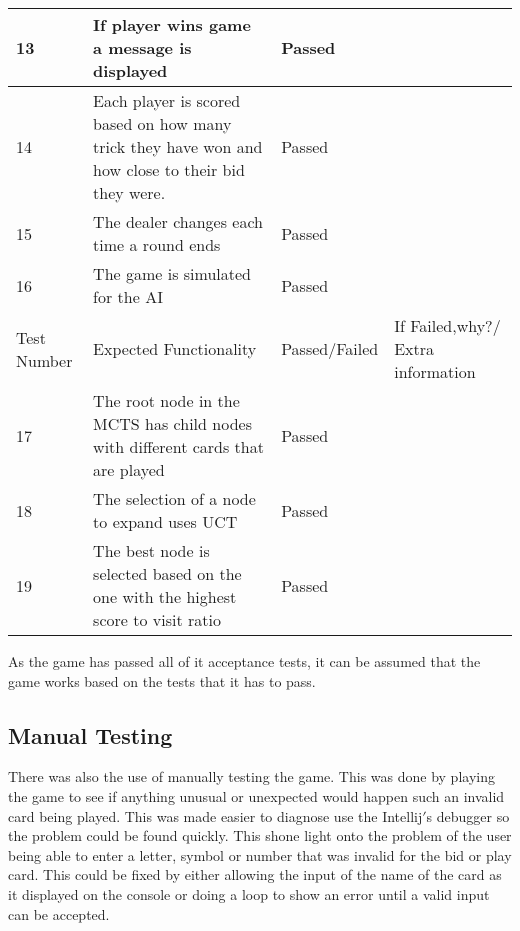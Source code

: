 \begin{center}
\begin{table}
\begin{tabular}{| l | p{5cm} | l | p{5cm} |}
\hline
13 & If player wins game a message is displayed & Passed & ~ \\ \hline
14 & Each player is scored based on how many trick they have won and how close to their bid they were. & Passed & ~ \\ \hline
15 & The dealer changes each time a round ends & Passed & ~ \\ \hline
16 & The game is simulated for the AI & Passed & ~ \\ \hline
Test Number & Expected Functionality & Passed/Failed & If Failed,why?/ Extra information \\ \hline
17 & The root node in the MCTS has child nodes with different cards that are played & Passed & ~ \\ \hline
18 & The selection of a node to expand uses UCT & Passed & ~ \\ \hline
19 & The best node is selected based on the one with the highest score to visit ratio & Passed & ~ \\
\hline
\end{tabular}
\end{table}
\end{center}
As the game has passed all of it acceptance tests, it can be assumed that the game works based on the tests that it has to pass.
\subsection{Manual Testing}
There was also the use of manually testing the game. This was done by playing the game to see if anything unusual or unexpected would happen such an invalid card being played. This was made easier to diagnose use the Intellij$'$s debugger so the problem could be found quickly. This shone light onto the problem of the user being able to enter a letter, symbol or number that was invalid for the bid or play card. This could be fixed by either allowing the input of the name of the card as it displayed on the console or doing a loop to show an error until a valid input can be accepted.

